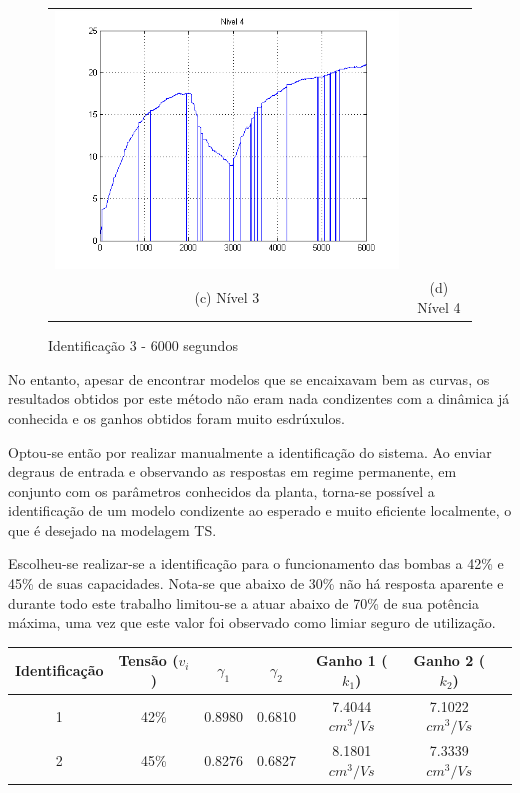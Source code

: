 \begin{figure}[H]
\begin{tabular}{cc}
		\includegraphics[height=0.15\paperheight,keepaspectratio]{img/sim3_h4.png} \\
		(c) Nível 3 &
		(d) Nível 4
	\end{tabular}
	\caption{\label{imgID_6000} Identificação 3 - 6000 segundos}
\end{figure}

No entanto, apesar de encontrar modelos que se encaixavam bem as curvas, os resultados obtidos por este método não eram nada condizentes com a dinâmica já conhecida e os ganhos obtidos foram muito esdrúxulos.

Optou-se então por realizar manualmente a identificação do sistema. Ao enviar degraus de entrada e observando as respostas em regime permanente, em conjunto com os parâmetros conhecidos da planta, torna-se possível a identificação de um modelo condizente ao esperado e muito eficiente localmente, o que é desejado na modelagem TS.

Escolheu-se realizar-se a identificação para o funcionamento das bombas a 42\% e 45\% de suas capacidades. Nota-se que abaixo de 30\% não há resposta aparente e durante todo este trabalho limitou-se a atuar abaixo de 70\% de sua potência máxima, uma vez que este valor foi observado como limiar seguro de utilização.

\begin{center} \label{tabIdentKs}
	\begin{tabular}{|c|c|c|c|c|c|c|}
		\hline
		Identificação & Tensão ($v_i$)&  $\gamma_1$ & $\gamma_2$ & Ganho 1 ($k_1$) & Ganho 2 ($k_2$) \\ \hline
		1 & 42\% & 0.8980 & 0.6810 & 7.4044 $cm^3/Vs$ & 7.1022 $cm^3/Vs$\\ \hline
		2 & 45\% & 0.8276 & 0.6827 & 8.1801 $cm^3/Vs$ & 7.3339 $cm^3/Vs$\\ \hline
	\end{tabular}
\end{center}

